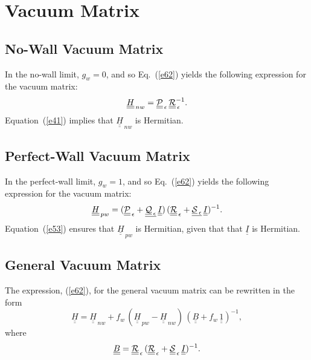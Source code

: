 \documentclass[12pt,prb,aps,notitlepage]{revtex4-1}
\begin{document}
\section{Vacuum Matrix}
\subsection{No-Wall Vacuum Matrix}
In the no-wall limit, $g_w=0$, and so Eq.~(\ref{e62}) yields the following expression for the vacuum matrix: 
\begin{equation}\label{e64x}
\underline{\underline{H}}_{\,nw}= \underline{\underline{\cal P}}_{\,\epsilon}\,\underline{\underline{\cal R}}_{\,\epsilon}^{-1}.
\end{equation}
Equation~(\ref{e41}) implies that $\underline{\underline{H}}_{\,nw}$ is Hermitian. 

\subsection{Perfect-Wall Vacuum Matrix}
In the perfect-wall limit, $g_w=1$, and  so Eq.~(\ref{e62}) yields  the following expression for the vacuum matrix: 
\begin{equation}\label{e65x}
\underline{\underline{H}}_{\,pw} = (\underline{\underline{\cal P}}_{\,\epsilon}+\underline{\underline{\cal Q}_{\,\epsilon}}\,\underline{\underline{I}})\,(\underline{\underline{\cal R}}_{\,\epsilon}+\underline{\underline{\cal S}_{\,\epsilon}}\,\underline{\underline{I}})^{-1}.
\end{equation}
Equation~(\ref{e53}) ensures  that $\underline{\underline{H}}_{\,pw}$ is Hermitian, given that that $\underline{\underline{I}}$ is Hermitian.

\subsection{General Vacuum Matrix}
The expression, (\ref{e62}), for the general vacuum matrix can be rewritten in the form 
\begin{equation}\label{e130}
\underline{\underline{H}} = \underline{\underline{H}}_{\,nw} + f_w\,( \underline{\underline{H}}_{\,pw} - \underline{\underline{H}}_{\,nw} )\,(\underline{\underline{B}}+f_w\,\underline{\underline{1}})^{-1},
\end{equation}
where
\begin{equation}
\underline{\underline{B}}= \underline{\underline{\cal R}}_{\,\epsilon}\,(\underline{\underline{\cal R}}_{\,\epsilon} + \underline{\underline{\cal S}}_{\,\epsilon}\,\underline{\underline{I}})^{-1}.
\end{equation}
\end{document}
